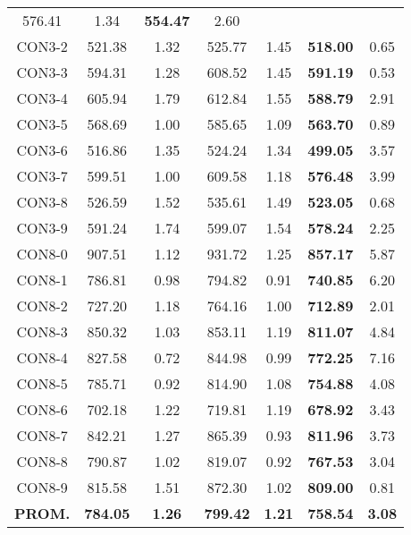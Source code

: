 \begin{table}[ht]
\begin{tabular}{c c c c c c c}
576.41 & 1.34 & \bf{554.47} & 
2.60\\CON3-2 & 521.38 & 1.32 & 
525.77 & 1.45 & \bf{518.00} & 
0.65\\CON3-3 & 594.31 & 1.28 & 
608.52 & 1.45 & \bf{591.19} & 
0.53\\CON3-4 & 605.94 & 1.79 & 
612.84 & 1.55 & \bf{588.79} & 
2.91\\CON3-5 & 568.69 & 1.00 & 
585.65 & 1.09 & \bf{563.70} & 
0.89\\CON3-6 & 516.86 & 1.35 & 
524.24 & 1.34 & \bf{499.05} & 
3.57\\CON3-7 & 599.51 & 1.00 & 
609.58 & 1.18 & \bf{576.48} & 
3.99\\CON3-8 & 526.59 & 1.52 & 
535.61 & 1.49 & \bf{523.05} & 
0.68\\CON3-9 & 591.24 & 1.74 & 
599.07 & 1.54 & \bf{578.24} & 
2.25\\CON8-0 & 907.51 & 1.12 & 
931.72 & 1.25 & \bf{857.17} & 
5.87\\CON8-1 & 786.81 & 0.98 & 
794.82 & 0.91 & \bf{740.85} & 
6.20\\CON8-2 & 727.20 & 1.18 & 
764.16 & 1.00 & \bf{712.89} & 
2.01\\CON8-3 & 850.32 & 1.03 & 
853.11 & 1.19 & \bf{811.07} & 
4.84\\CON8-4 & 827.58 & 0.72 & 
844.98 & 0.99 & \bf{772.25} & 
7.16\\CON8-5 & 785.71 & 0.92 & 
814.90 & 1.08 & \bf{754.88} & 
4.08\\CON8-6 & 702.18 & 1.22 & 
719.81 & 1.19 & \bf{678.92} & 
3.43\\CON8-7 & 842.21 & 1.27 & 
865.39 & 0.93 & \bf{811.96} & 
3.73\\CON8-8 & 790.87 & 1.02 & 
819.07 & 0.92 & \bf{767.53} & 
3.04\\CON8-9 & 815.58 & 1.51 & 
872.30 & 1.02 & \bf{809.00} & 
0.81\\\bf{PROM.} & 
\bf{784.05} & \bf{1.26} & \bf{799.42} & \bf{1.21} & \bf{758.54} & \bf{3.08}\\[1ex]\hline
\end{tabular}
\label{table:nonlin}
\end{table} \clearpage

